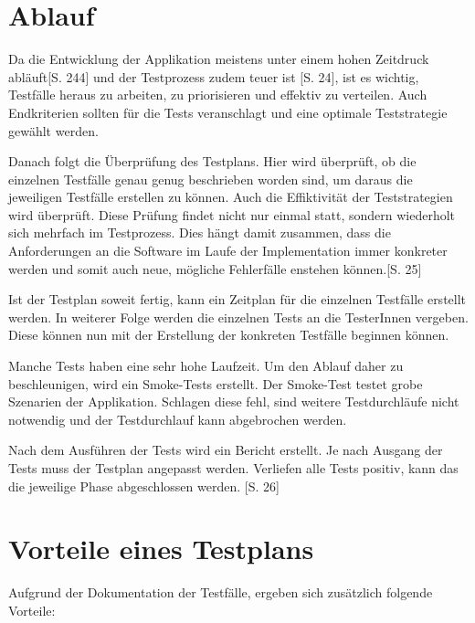 \documentclass[a4paper,bibtotoc,oneside]{scrbook}
\begin{document}
\section{Ablauf}
Da die Entwicklung der Applikation meistens unter einem hohen Zeitdruck abläuft\cite{software_qual}[S. 244] und der Testprozess zudem teuer ist \cite{eval_regression}[S. 24], ist es wichtig, Testfälle heraus zu arbeiten, zu priorisieren und effektiv zu verteilen. Auch Endkriterien sollten für die Tests veranschlagt und eine optimale Teststrategie gewählt werden.

Danach folgt die Überprüfung des Testplans. Hier wird überprüft, ob die einzelnen Testfälle genau genug beschrieben worden sind, um daraus die jeweiligen Testfälle erstellen zu können. Auch die Effiktivität der Teststrategien wird überprüft. Diese Prüfung findet nicht nur einmal statt, sondern wiederholt sich mehrfach im Testprozess. Dies hängt damit zusammen, dass die Anforderungen an die Software im Laufe der Implementation immer konkreter werden und somit auch neue, mögliche Fehlerfälle enstehen können.\cite{eval_regression}[S. 25] 

Ist der Testplan soweit fertig, kann ein Zeitplan für die einzelnen Testfälle erstellt werden. In weiterer Folge werden die einzelnen Tests an die TesterInnen vergeben. Diese können nun mit der Erstellung der konkreten Testfälle beginnen können.

Manche Tests haben eine sehr hohe Laufzeit. Um den Ablauf daher zu beschleunigen, wird ein Smoke-Tests erstellt. Der Smoke-Test testet grobe Szenarien der Applikation. Schlagen diese fehl, sind weitere Testdurchläufe nicht notwendig und der Testdurchlauf kann abgebrochen werden. 

Nach dem Ausführen der Tests wird ein Bericht erstellt. Je nach Ausgang der Tests muss der Testplan angepasst werden. Verliefen alle Tests positiv, kann das die jeweilige Phase abgeschlossen werden. \cite{eval_regression}[S. 26]


\section{Vorteile eines Testplans}

Aufgrund der Dokumentation der Testfälle, ergeben sich zusätzlich folgende Vorteile:
\end{document}
